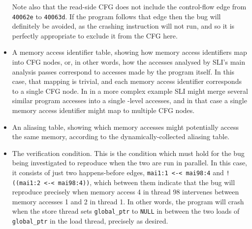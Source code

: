 \begin{itemize}
  Note also that the read-side CFG does not include the control-flow
  edge from \verb|40062e| to \verb|40063d|.  If the program follows
  that edge then the bug will definitely be avoided, as the crashing
  instruction will not run, and so it is perfectly appropriate to
  exclude it from the CFG here.
\item A memory access identifier table, showing how memory access
  identifiers map into CFG nodes, or, in other words, how the accesses
  analysed by SLI's main analysis passes correspond to accesses made
  by the program itself.  In this case, that mapping is trivial, and
  each memory access identifier corresponds to a single CFG node.  In
  in a more complex example SLI might merge several similar program
  accesses into a single \StateMachine-level accesses, and in that
  case a single memory access identifier might map to multiple CFG
  nodes.
\item An aliasing table, showing which memory accesses might
  potentially access the same memory, according to the
  dynamically-collected aliasing table.
\item The verification condition.  This is the condition which must
  hold for the bug being investigated to reproduce when the two
  \StateMachines are run in parallel.  In this case, it consists of
  just two happens-before edges, \verb|mai1:1 <-< mai98:4| and
  \verb|!((mai1:2 <-< mai98:4))|, which between them indicate that the
  bug will reproduce precisely when memory access 4 in thread 98
  intervenes between memory accesses 1 and 2 in thread 1.  In other
  words, the program will crash when the store thread sets
  \verb|global_ptr| to \verb|NULL| in between the two loads of
  \verb|global_ptr| in the load thread, precisely as desired.
\end{itemize}

